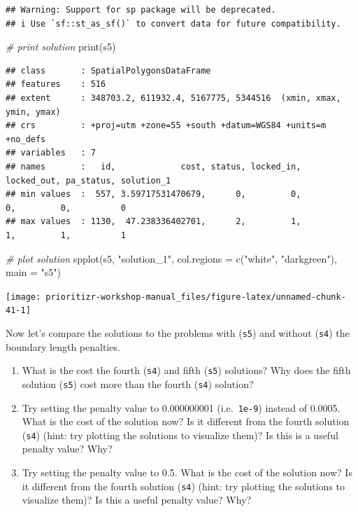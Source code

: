 \documentclass[
  12pt,
]{book}
\makeatletter
\newenvironment{Shaded}{\begin{snugshade}}{\end{snugshade}}
\newcommand{\AttributeTok}[1]{\textcolor[rgb]{0.77,0.63,0.00}{#1}}
\newcommand{\CommentTok}[1]{\textcolor[rgb]{0.56,0.35,0.01}{\textit{#1}}}
\newcommand{\FunctionTok}[1]{\textcolor[rgb]{0.00,0.00,0.00}{#1}}
\newcommand{\NormalTok}[1]{#1}
\newcommand{\StringTok}[1]{\textcolor[rgb]{0.31,0.60,0.02}{#1}}
\providecommand{\tightlist}{%
  \setlength{\itemsep}{0pt}\setlength{\parskip}{0pt}}
\newenvironment{kframe}{%
\medskip{}
\setlength{\fboxsep}{.8em}
 \def\at@end@of@kframe{}%
 \ifinner\ifhmode%
  \def\at@end@of@kframe{\end{minipage}}%
  \begin{minipage}{\columnwidth}%
 \fi\fi%
 \def\FrameCommand##1{\hskip\@totalleftmargin \hskip-\fboxsep
 \colorbox{shadecolor}{##1}\hskip-\fboxsep
     \hskip-\linewidth \hskip-\@totalleftmargin \hskip\columnwidth}%
 \MakeFramed {\advance\hsize-\width
   \@totalleftmargin\z@ \linewidth\hsize
   \@setminipage}}%
 {\par\unskip\endMakeFramed%
 \at@end@of@kframe}
\newenvironment{rmdblock}[1]
  {
  \begin{itemize}
  \renewcommand{\labelitemi}{
    \raisebox{-.7\height}[0pt][0pt]{
      {\setkeys{Gin}{width=3em,keepaspectratio}\texttt{[image: images/\#1]}}
    }
  }
  \setlength{\fboxsep}{1em}
  \begin{kframe}
  \item
  }
  {
  \end{kframe}
  \end{itemize}
  }
\newenvironment{rmdquestion}
  {\begin{rmdblock}{question}}
  {\end{rmdblock}}
\makeatother
\begin{document}
\begin{verbatim}
## Warning: Support for sp package will be deprecated.
## i Use `sf::st_as_sf()` to convert data for future compatibility.
\end{verbatim}

\begin{Shaded}
\begin{Highlighting}[]
\CommentTok{\# print solution}
\FunctionTok{print}\NormalTok{(s5)}
\end{Highlighting}
\end{Shaded}

\begin{verbatim}
## class       : SpatialPolygonsDataFrame 
## features    : 516 
## extent      : 348703.2, 611932.4, 5167775, 5344516  (xmin, xmax, ymin, ymax)
## crs         : +proj=utm +zone=55 +south +datum=WGS84 +units=m +no_defs 
## variables   : 7
## names       :   id,             cost, status, locked_in, locked_out, pa_status, solution_1 
## min values  :  557, 3.59717531470679,      0,         0,          0,         0,          0 
## max values  : 1130,  47.238336402701,      2,         1,          1,         1,          1
\end{verbatim}

\begin{Shaded}
\begin{Highlighting}[]
\CommentTok{\# plot solution}
\FunctionTok{spplot}\NormalTok{(s5, }\StringTok{"solution\_1"}\NormalTok{, }\AttributeTok{col.regions =} \FunctionTok{c}\NormalTok{(}\StringTok{"white"}\NormalTok{, }\StringTok{"darkgreen"}\NormalTok{), }\AttributeTok{main =} \StringTok{"s5"}\NormalTok{)}
\end{Highlighting}
\end{Shaded}

\begin{center}\texttt{[image: prioritizr-workshop-manual\_files/figure-latex/unnamed-chunk-41-1]} \end{center}

Now let's compare the solutions to the problems with (\texttt{s5}) and without (\texttt{s4}) the boundary length penalties.

\begin{rmdquestion}
\begin{enumerate}
\def\labelenumi{\arabic{enumi}.}
\tightlist
\item
  What is the cost the fourth (\texttt{s4}) and fifth (\texttt{s5}) solutions? Why does the fifth solution (\texttt{s5}) cost more than the fourth (\texttt{s4}) solution?
\item
  Try setting the penalty value to 0.000000001 (i.e.~\texttt{1e-9}) instead of 0.0005. What is the cost of the solution now? Is it different from the fourth solution (\texttt{s4}) (hint: try plotting the solutions to visualize them)? Is this is a useful penalty value? Why?
\item
  Try setting the penalty value to 0.5. What is the cost of the solution now? Is it different from the fourth solution (\texttt{s4}) (hint: try plotting the solutions to visualize them)? Is this a useful penalty value? Why?
\end{enumerate}
\end{rmdquestion}
\end{document}
